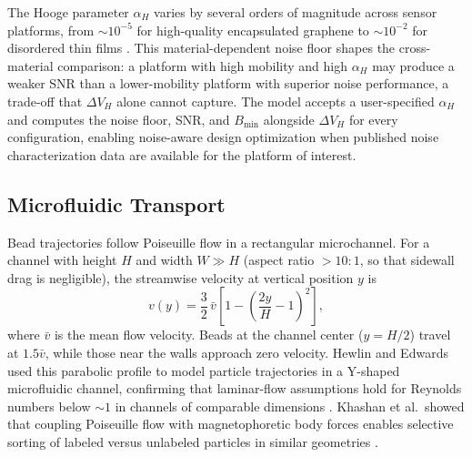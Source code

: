 \documentclass[micromachines,article,submit,pdftex,moreauthors]{Definitions/mdpi}
\begin{document}
The Hooge parameter $\alpha_H$ varies by several orders of magnitude across sensor
platforms, from ${\sim}10^{-5}$ for high-quality encapsulated graphene to
${\sim}10^{-2}$ for disordered thin films \cite{xu2013,huang2014}. This
material-dependent noise floor shapes the cross-material comparison: a platform with
high mobility and high $\alpha_H$ may produce a weaker SNR than a lower-mobility
platform with superior noise performance, a trade-off that $\Delta V_H$ alone cannot
capture. The model accepts a user-specified $\alpha_H$ and computes the noise floor,
SNR, and $B_\text{min}$ alongside $\Delta V_H$ for every configuration, enabling
noise-aware design optimization when published noise characterization data are
available for the platform of interest.

\subsection{Microfluidic Transport}
\label{sec:transport}

Bead trajectories follow Poiseuille flow in a rectangular microchannel. For a
channel with height $H$ and width $W \gg H$ (aspect ratio ${>}10{:}1$, so that
sidewall drag is negligible), the streamwise velocity at vertical position $y$ is
\begin{equation}
v(y) = \frac{3}{2}\,\bar{v}\left[1 - \left(\frac{2y}{H} - 1\right)^2\right],
\label{eq:poiseuille}
\end{equation}
where $\bar{v}$ is the mean flow velocity. Beads at the channel center ($y = H/2$)
travel at $1.5\bar{v}$, while those near the walls approach zero velocity. Hewlin
and Edwards used this parabolic profile to model particle trajectories in a Y-shaped
microfluidic channel, confirming that laminar-flow assumptions hold for Reynolds
numbers below ${\sim}1$ in channels of comparable dimensions \cite{hewlin2023}.
Khashan et al.\ showed that coupling Poiseuille flow with magnetophoretic body
forces enables selective sorting of labeled versus unlabeled particles in similar
geometries \cite{khashan2024}.
\end{document}
